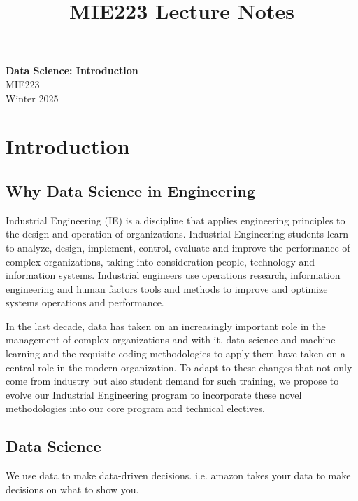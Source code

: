 \documentclass[11pt]{article}
\theoremstyle{definition}
\begin{document}
\setcounter{section}{0}
\title{MIE223 Lecture Notes}

\thispagestyle{empty}

\begin{center}
{\LARGE \bf Data Science: Introduction}\\
{\large MIE223}\\
Winter 2025
\end{center}
\section{Introduction}
\subsection{Why Data Science in Engineering}

Industrial Engineering (IE) is a discipline that applies engineering principles to the design and operation of
organizations. Industrial Engineering students learn to analyze, design, implement, control, evaluate and
improve the performance of complex organizations, taking into consideration people, technology and information
systems. Industrial engineers use operations research, information engineering and human factors tools and
methods to improve and optimize systems operations and performance.

In the last decade, data has taken on an increasingly important role in the management of complex
organizations and with it, data science and machine learning and the requisite coding methodologies to apply
them have taken on a central role in the modern organization. To adapt to these changes that not only come
from industry but also student demand for such training, we propose to evolve our Industrial Engineering program
to incorporate these novel methodologies into our core program and technical electives.

\subsection{Data Science}
We use data to make data-driven decisions. i.e. amazon takes your data to make decisions on what to show you.
\end{document}
